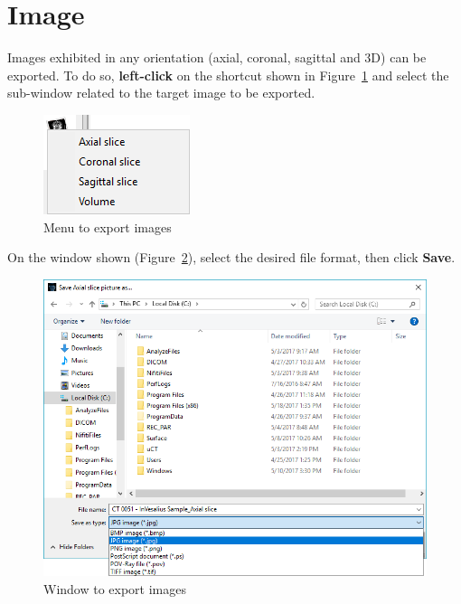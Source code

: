 \section{Image}

Images exhibited in any orientation (axial, coronal, sagittal and 3D) can be exported. To do so, \textbf{left-click} on the shortcut shown in Figure~\ref{fig:menu_save_image_window} and select the sub-window related to the target image to be exported.

\begin{figure}[!htb]
\centering
\includegraphics[scale=0.5]{../user_guide_figures/invesalius_screen/menu_save_image_window_en.png}
\caption{Menu to export images}
\label{fig:menu_save_image_window}
\end{figure}

On the window shown (Figure~\ref{fig:save_image_window}), select the desired file format, then click \textbf{Save}.

\begin{figure}[!htb]
\centering
\includegraphics[scale=0.4]{../user_guide_figures/invesalius_screen/export_bmp_en.png}
\caption{Window to export images}
\label{fig:save_image_window}
\end{figure}
